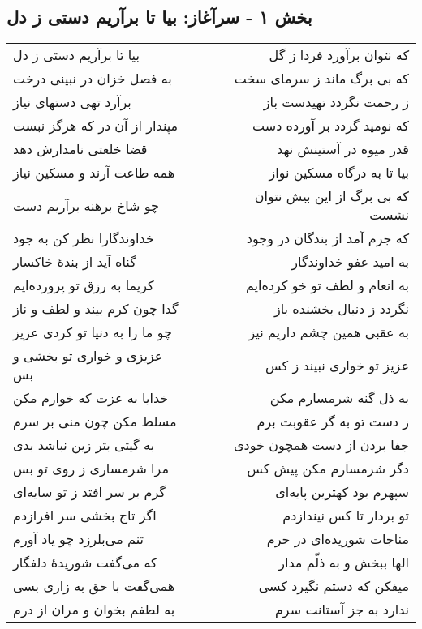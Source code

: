 \begin{center}
\section*{بخش ۱ - سرآغاز: بیا تا برآریم دستی ز دل}
\label{sec:001}
\begin{longtable}{l p{0.5cm} r}
بیا تا برآریم دستی ز دل
&&
که نتوان برآورد فردا ز گل
\\
به فصل خزان در نبینی درخت
&&
که بی برگ ماند ز سرمای سخت
\\
برآرد تهی دستهای نیاز
&&
ز رحمت نگردد تهیدست باز
\\
مپندار از آن در که هرگز نبست
&&
که نومید گردد بر آورده دست
\\
قضا خلعتی نامدارش دهد
&&
قدر میوه در آستینش نهد
\\
همه طاعت آرند و مسکین نیاز
&&
بیا تا به درگاه مسکین نواز
\\
چو شاخ برهنه برآریم دست
&&
که بی برگ از این بیش نتوان نشست
\\
خداوندگارا نظر کن به جود
&&
که جرم آمد از بندگان در وجود
\\
گناه آید از بندهٔ خاکسار
&&
به امید عفو خداوندگار
\\
کریما به رزق تو پرورده‌ایم
&&
به انعام و لطف تو خو کرده‌ایم
\\
گدا چون کرم بیند و لطف و ناز
&&
نگردد ز دنبال بخشنده باز
\\
چو ما را به دنیا تو کردی عزیز
&&
به عقبی همین چشم داریم نیز
\\
عزیزی و خواری تو بخشی و بس
&&
عزیز تو خواری نبیند ز کس
\\
خدایا به عزت که خوارم مکن
&&
به ذل گنه شرمسارم مکن
\\
مسلط مکن چون منی بر سرم
&&
ز دست تو به گر عقوبت برم
\\
به گیتی بتر زین نباشد بدی
&&
جفا بردن از دست همچون خودی
\\
مرا شرمساری ز روی تو بس
&&
دگر شرمسارم مکن پیش کس
\\
گرم بر سر افتد ز تو سایه‌ای
&&
سپهرم بود کهترین پایه‌ای
\\
اگر تاج بخشی سر افرازدم
&&
تو بردار تا کس نیندازدم
\\
تنم می‌بلرزد چو یاد آورم
&&
مناجات شوریده‌ای در حرم
\\
که می‌گفت شوریدهٔ دلفگار
&&
الها ببخش و به ذلّم مدار
\\
همی‌گفت با حق به زاری بسی
&&
میفکن که دستم نگیرد کسی
\\
به لطفم بخوان و مران از درم
&&
ندارد به جز آستانت سرم
\\

\end{longtable}
\end{center}
